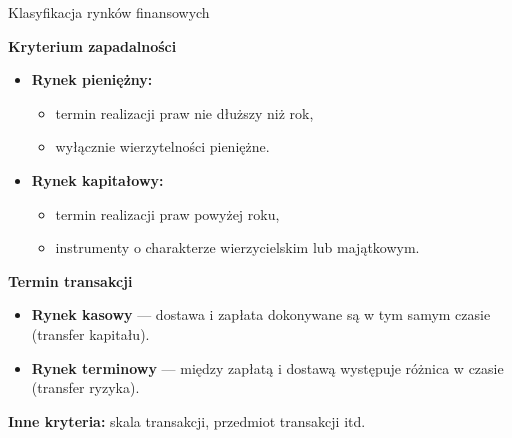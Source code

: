 \documentclass[a4paper, 11pt]{beamer}
\begin{document}
	\begin{frame}{Klasyfikacja rynków finansowych}
		\begin{block}{\textbf{Kryterium zapadalności}}
			\begin{itemize}
				\item \textbf{Rynek pieniężny:}
				\begin{itemize}
					\item termin realizacji praw nie dłuższy niż rok,
					\item wyłącznie wierzytelności pieniężne.
				\end{itemize}
				\item \textbf{Rynek kapitałowy:}
				\begin{itemize}
					\item termin realizacji praw powyżej roku,
					\item instrumenty o charakterze wierzycielskim lub majątkowym.
				\end{itemize}
			\end{itemize}
		\end{block}
		\begin{block}{\textbf{Termin transakcji}}
			\begin{itemize}
				\item \textbf{Rynek kasowy} --- dostawa i zapłata dokonywane są w tym samym czasie (transfer kapitału).
				\item \textbf{Rynek terminowy} --- między zapłatą i dostawą występuje różnica w czasie (transfer ryzyka).
			\end{itemize}
		\end{block}
		\textbf{Inne kryteria:} skala transakcji, przedmiot transakcji itd.
	\end{frame}
	
\end{document}
